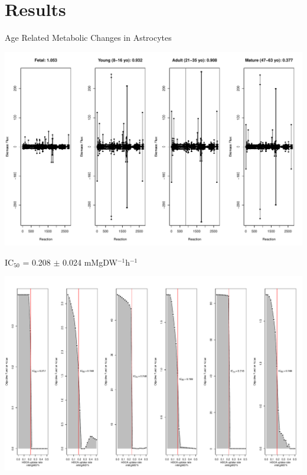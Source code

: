 \documentclass[11pt]{beamer}
\begin{document}
\section{Results}
\begin{frame}{Age Related Metabolic Changes in Astrocytes}
\begin{center}
\includegraphics[width=\textwidth]{Astrocyte_MetabolicChanges}
\end{center}
\end{frame}
\begin{frame}{IC$_{50}$ = 0.208 $\pm$ 0.024 mMgDW$^{-1}$h$^{-1}$}
\begin{center}
\includegraphics[width=\textwidth]{IC50}
\end{center}
\end{frame}
\end{document}
